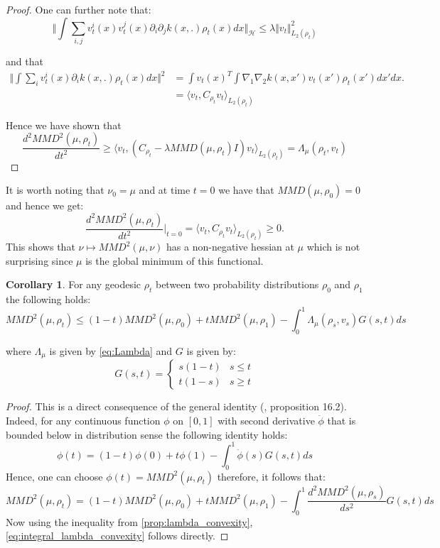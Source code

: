 \documentclass{article}
\newcommand{\1}{\mathbbm 1}
\theoremstyle{definition}
\newtheorem{corollary}[theorem]{Corollary}
\begin{document}
\begin{proof}
One can further note that:
\[
\Vert\int\sum_{i,j}v_{t}^{i}(x)v_{t}^{j}(x)\partial_{i}\partial_{j}k(x,.)\rho_{t}(x)dx\Vert_{\mathcal{H}}\leq\lambda\Vert v_{t}\Vert_{L_{2}(\rho_{t})}^{2}
\]

and that 
\begin{align*}
\Vert\int\sum_{i}v_{t}^{i}(x)\partial_{i}k(x,.)\rho_{t}(x)dx\Vert^{2} & =\int v_{t}(x)^{T}\int\nabla_{1}\nabla_{2}k(x,x')v_{t}(x')\rho_{t}(x')dx'dx.\\
 & =\langle v_{t},C_{\rho_{t}}v_{t}\rangle_{L_{2}(\rho_{t})}
\end{align*}

Hence we have shown that 
\[
\frac{d^{2}MMD^{2}(\mu,\rho_{t})}{dt^{2}}\geq\langle v_{t},(C_{\rho_{t}}-\lambda MMD(\mu,\rho_{t})I)v_{t}\rangle_{L_{2}(\rho_{t})}=\Lambda_{\mu}(\rho_{t},v_{t})
\]
\end{proof}
%
It is worth noting that $\nu_{0}=\mu$ and at time $t=0$ we have
that $MMD(\mu,\rho_{0})=0$ and hence we get:
\[
\frac{d^{2}MMD^{2}(\mu,\rho_{t})}{dt^{2}}\vert_{t=0}=\langle v_{t},C_{\rho_{t}}v_{t}\rangle_{L_{2}(\rho_{t})}\geq0.
\]
This shows that $\nu\mapsto MMD^{2}(\mu,\nu)$ has a non-negative
hessian at $\mu$ which is not surprising since $\mu$ is the global
minimum of this functional.
\begin{corollary}
For any geodesic $\rho_{t}$ between two probability distributions
$\rho_{0}$ and $\rho_{1}$ the following holds:
\begin{equation}
MMD^{2}(\mu,\rho_{t})\leq(1-t)MMD^{2}(\mu,\rho_{0})+tMMD^{2}(\mu,\rho_{1})-\int_{0}^{1}\Lambda_{\mu}(\rho_{s},v_{s})G(s,t)ds\label{eq:integral_lambda_convexity}
\end{equation}

where $\Lambda_{\mu}$ is given by \ref{eq:Lambda} and $G$ is given
by:
\[
G(s,t)=\begin{cases}
s(1-t) & s\leq t\\
t(1-s) & s\geq t
\end{cases}
\]
\end{corollary}
%
\begin{proof}
This is a direct consequence of the general identity (\cite{Villani:2009},
proposition 16.2). Indeed, for any continuous function $\phi$ on
$[0,1]$ with second derivative $\ddot{\phi}$ that is bounded below
in distribution sense the following identity holds:
\[
\phi(t)=(1-t)\phi(0)+t\phi(1)-\int_{0}^{1}\ddot{\phi}(s)G(s,t)ds
\]
Hence, one can choose $\phi(t)=MMD^{2}(\mu,\rho_{t})$ therefore,
it follows that:
\[
MMD^{2}(\mu,\rho_{t})=(1-t)MMD^{2}(\mu,\rho_{0})+tMMD^{2}(\mu,\rho_{1})-\int_{0}^{1}\frac{d^{2}MMD^{2}(\mu,\rho_{s})}{ds^{2}}G(s,t)ds
\]
Now using the inequality from \ref{prop:lambda_convexity}, \ref{eq:integral_lambda_convexity}
follows directly. 
\end{proof}
\end{document}

